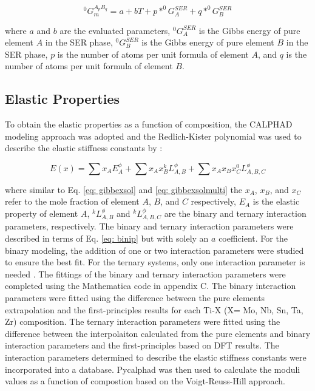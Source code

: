 \begin{equation}
\label{eq: stoichiometric}
^{0}G_{m}^{A_{p}B_{q}} = a + bT + p * ^{0}G_{A}^{SER} + q * ^{0}G_{B}^{SER}
\end{equation}

\noindent where $a$ and $b$ are the evaluated parameters, $^{0}G_{A}^{SER}$ is the Gibbs energy of pure element $A$ in the SER phase, $^{0}G_{B}^{SER}$ is the Gibbs energy of pure element $B$ in the SER phase, $p$ is the number of atoms per unit formula of element $A$, and $q$ is the number of atoms per unit formula of element $B$.

\subsection{Elastic Properties}

To obtain the elastic properties as a function of composition, the CALPHAD modeling approach was adopted and the Redlich-Kister polynomial was used to describe the elastic stiffness constants by \cite{Redlich1948b,Shang2010c}: 

\begin{equation}
\label{eq: elastic}
E(x) = \sum x_{A} E_{A}^{\phi} + \sum x_{A} x_{B} ^{k}L_{A,B}^{\phi} + \sum x_{A} x_{B} x_{C} ^{0}L_{A, B, C}^{\phi}
\end{equation}

\noindent where similar to Eq. \ref{eq: gibbexsol} and \ref{eq: gibbexsolmulti} the $x_A$, $x_B$, and $x_C$ refer to the mole fraction of element $A$, $B$, and $C$ respectively, $E_{A}$ is the elastic property of element $A$, $^{k}L_{A,B}^{\phi}$ and $^{k}L_{A,B,C}^{\phi}$ are the binary and ternary interaction parameters, respectively. The binary and ternary interaction parameters were described in terms of Eq. \ref{eq: binip} but with solely an $a$ coefficient. For the binary modeling, the addition of one or two interaction parameters were studied to ensure the best fit. For the ternary systems, only one interaction parameter is needed \cite{Liu2009,Saunders1998,Lukas2007}. The fittings of the binary and ternary interaction parameters were completed using the Mathematica code in appendix C. The binary interaction parameters were fitted using the difference between the pure elements extrapolation and the first-principles results for each Ti-X (X= Mo, Nb, Sn, Ta, Zr) composition. The ternary interaction parameters were fitted using the difference between the interpolaiton calculated from the pure elements and binary interaction parameters and the first-principles based on DFT results. The interaction parameters determined to describe the elastic stiffness constants were incorporated into a database. Pycalphad \cite{Otis2017} was then used to calculate the moduli values as a function of compostion based on the Voigt-Reuss-Hill approach.


